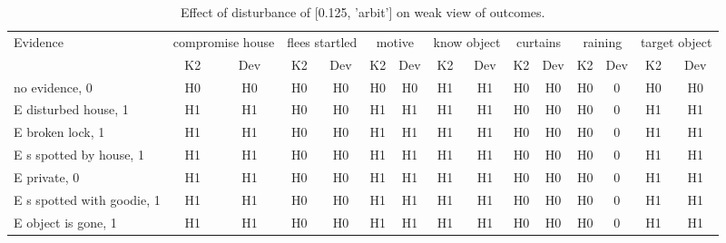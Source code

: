 \begin{table}\begin{tabular}{l|cc|cc|cc|cc|cc|cc|cc}\toprule\multirow{2}{*}{Evidence} & \multicolumn{2}{c}{compromise house}& \multicolumn{2}{c}{flees startled}& \multicolumn{2}{c}{motive}& \multicolumn{2}{c}{know object}& \multicolumn{2}{c}{curtains}& \multicolumn{2}{c}{raining}& \multicolumn{2}{c}{target object}\\& {K2} & {Dev}& {K2} & {Dev}& {K2} & {Dev}& {K2} & {Dev}& {K2} & {Dev}& {K2} & {Dev}& {K2} & {Dev}\\\midrule
no evidence, 0 & H0&H0&H0&H0&H0&H0&H1&H1&H0&H0&\cellcolor{Bittersweet}H0&\cellcolor{Bittersweet}0&H0&H0\\E disturbed house, 1 & H1&H1&H0&H0&H1&H1&H1&H1&H0&H0&\cellcolor{Bittersweet}H0&\cellcolor{Bittersweet}0&H1&H1\\E broken lock, 1 & H1&H1&H0&H0&H1&H1&H1&H1&H0&H0&\cellcolor{Bittersweet}H0&\cellcolor{Bittersweet}0&H1&H1\\E s spotted by house, 1 & H1&H1&H0&H0&H1&H1&H1&H1&H0&H0&\cellcolor{Bittersweet}H0&\cellcolor{Bittersweet}0&H1&H1\\E private, 0 & H1&H1&H0&H0&H1&H1&H1&H1&H0&H0&\cellcolor{Bittersweet}H0&\cellcolor{Bittersweet}0&H1&H1\\E s spotted with goodie, 1 & H1&H1&H0&H0&H1&H1&H1&H1&H0&H0&\cellcolor{Bittersweet}H0&\cellcolor{Bittersweet}0&H1&H1\\E object is gone, 1 & H1&H1&H0&H0&H1&H1&H1&H1&H0&H0&\cellcolor{Bittersweet}H0&\cellcolor{Bittersweet}0&H1&H1\\\bottomrule\end{tabular}\caption{Effect of disturbance of [0.125, 'arbit'] on weak view of outcomes.}\end{table}